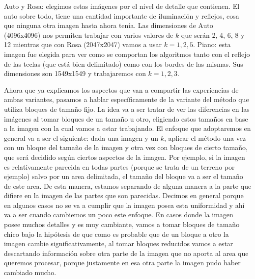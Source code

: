 \documentclass[a4paper]{article}
\begin{document}
\newline \newline Auto y Rosa: elegimos estas imágenes por el nivel de detalle que contienen. El auto sobre todo, tiene una cantidad importante de iluminación y reflejos, cosa que ninguna otra imagen hasta ahora tenía. Las dimensiones de Auto (4096x4096) nos permiten trabajar con varios valores de $k$ que serán 2, 4, 6, 8 y 12 mientras que con Rosa (2047x2047) vamos a usar $k = 1, 2, 5$.
\newline \newline Piano: esta imagen fue elegida para ver como se comportan los algoritmos tanto con el reflejo de las teclas (que está bien delimitado) como con los bordes de las mismas. Sus dimensiones son 1549x1549 y trabajaremos con $k = 1, 2, 3$.

Ahora que ya explicamos los aspectos que van a compartir las experiencias de ambas variantes, pasamos a hablar específicamente de la variante del método que utiliza bloques de tamaño fijo. La idea va a ser tratar de ver las diferencias en las imágenes al tomar bloques de un tamaño u otro, eligiendo estos tamaños en base a la imagen con la cual vamos a estar trabajando. El enfoque que adoptaremos en general va a ser el siguiente: dada una imagen y un $k$, aplicar el método una vez con un bloque del tamaño de la imagen y otra vez con bloques de cierto tamaño, que será decidido según ciertos aspectos de la imagen. Por ejemplo, si la imagen es relativamente parecida en todas partes (porque se trata de un terreno por ejemplo) salvo por un area delimitada, el tamaño del bloque va a ser el tamaño de este area. De esta manera, estamos separando de alguna manera a la parte que difiere en la imagen de las partes que son parecidas. Decimos en general porque en algunos casos no se va a cumplir que la imagen posea esta uniformidad y ahí va a ser cuando cambiemos un poco este enfoque. En casos donde la imagen posee muchos detalles y es muy cambiante, vamos a tomar bloques de tamaño chico bajo la hipótesis de que como es probable que de un bloque a otro la imagen cambie significativamente, al tomar bloques reducidos vamos a estar descartando información sobre otra parte de la imagen que no aporta al area que queremos procesar, porque justamente en esa otra parte la imagen pudo haber cambiado mucho.
\end{document}
